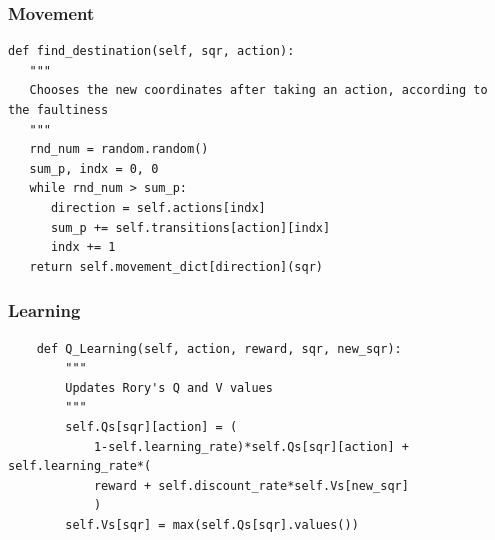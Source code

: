 \documentclass{beamer}
\begin{document}
\begin{frame}[fragile]
\frametitle{Movement}

\begin{lstlisting}
def find_destination(self, sqr, action):
   """
   Chooses the new coordinates after taking an action, according to the faultiness
   """
   rnd_num = random.random()
   sum_p, indx = 0, 0
   while rnd_num > sum_p:
      direction = self.actions[indx]
      sum_p += self.transitions[action][indx]
      indx += 1
   return self.movement_dict[direction](sqr)
\end{lstlisting}
\end{frame}



\begin{frame}[fragile]
\frametitle{Learning}

\begin{lstlisting}
	def Q_Learning(self, action, reward, sqr, new_sqr):
	    """
	    Updates Rory's Q and V values
	    """
	    self.Qs[sqr][action] = (
	        1-self.learning_rate)*self.Qs[sqr][action] + self.learning_rate*(
	        reward + self.discount_rate*self.Vs[new_sqr]
	        )
	    self.Vs[sqr] = max(self.Qs[sqr].values())
\end{lstlisting}
\end{frame}
\end{document}
